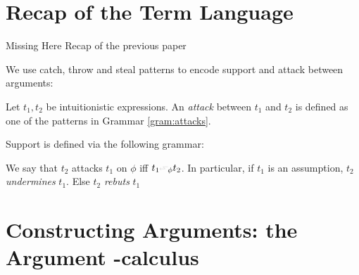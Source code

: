 \documentclass{article}
\begin{document}
\section{Recap of the Term Language}

\begin{oldpart}{Missing}
  Here Recap of the previous paper
\end{oldpart}

We use catch, throw and steal patterns to encode support and attack between arguments:



  \begin{definition}[Attack]
    Let $t_1,t_2$ be intuitionistic \matilda expressions. An \emph{attack} between $t_1$ and $t_2$ is defined as one of the patterns in Grammar \ref{gram:attacks}.

    \begin{definition}[Support]
      Support is defined via the following grammar:
  
     \begin{grammar}
     \end{grammar}
     \end{definition}


    \begin{grammar}
    \end{grammar}

    We say that $t_2$ attacks $t_1$ on $\phi$ iff $t_1\leftattack_\phi t_2$. In particular, if $t_1$ is an assumption, $t_2$ \emph{undermines} $t_1$. Else $t_2$ \emph{rebuts} $t_1$
  \end{definition}

\section{Constructing Arguments: the Argument -calculus}
\end{document}
